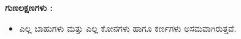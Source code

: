 \begin{enumerate}
 \medskip 
 \textbf{ಗುಣಲಕ್ಷಣಗಳು :}
 \begin{itemize}
 \item ಎಲ್ಲ ಬಾಹುಗಳು ಮತ್ತು ಎಲ್ಲ ಕೋನಗಳು ಹಾಗೂ ಕರ್ಣಗಳು ಅಸಮವಾಗಿರುತ್ತವೆ. 
   \end{itemize}
  \end{enumerate}
 
    
